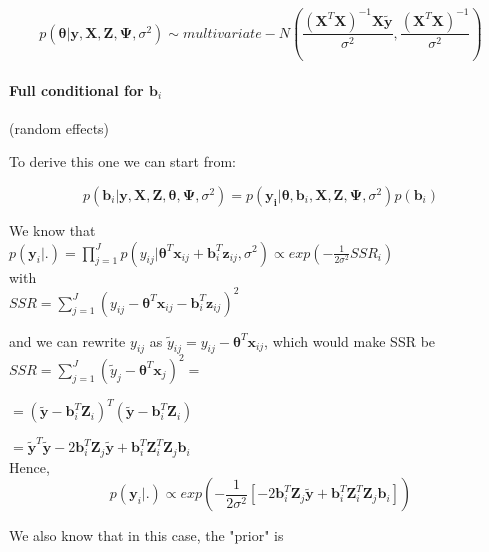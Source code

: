 \documentclass[a4paper]{article}
\begin{document}
\begin{equation}
	p(\bm{\theta}|\bm{y}, \bm{X}, \bm{Z}, \bm{\Psi}, \sigma^2) \sim multivariate-N(\frac{(\bm{X}^{T}\bm{X})^{-1}\bm{X}\bm{\tilde{y}}}{\sigma^2}, \frac{(\bm{X}^{T}\bm{X})^{-1}}{\sigma^2})
\end{equation}

\paragraph{Full conditional for $\bm{b}_{i}$} (random effects)

To derive this one we can start from:

\begin{equation}
	p(\bm{b}_{i}|\bm{y}, \bm{X}, \bm{Z}, \bm{\theta}, \bm{\Psi}, \sigma^2) = 	p(\bm{y_{i}}|\bm{\theta}, \bm{b}_{i}, \bm{X}, \bm{Z}, \bm{\Psi}, \sigma^2) p(\bm{b}_{i})
\end{equation}

We know that \\

$p(\bm{y}_{i}|.) = \prod_{j=1}^{J}p(y_{ij}|\bm{\theta}^{T}\bm{x}_{ij} + \bm{b}_{i}^{T}\bm{z}_{ij}, \sigma^2) \propto exp(-\frac{1}{2\sigma^2}SSR_{i})$\\

with\\

$SSR = \sum_{j = 1}^{J}( y_{ij}-\bm{\theta}^{T}\bm{x}_{ij} - \bm{b}_{i}^{T}\bm{z}_{ij})^2$

and we can rewrite $y_{ij}$ as $\tilde{y}_{ij} = y_{ij} - \bm{\theta}^{T}\bm{x}_{ij}$, which would make SSR be\\

$SSR = \sum_{j = 1}^{J}( \tilde{y}_{j}-\bm{\theta}^{T}\bm{x}_{j})^2=$

$= ( \tilde{\bm{y}} - \bm{b}_{i}^{T}\bm{Z}_{i})^{T}( \tilde{\bm{y}} - \bm{b}_{i}^{T}\bm{Z}_{i})$

$ = \tilde{\bm{y}}^{T}\tilde{\bm{y}} - 2\bm{b}_{i}^{T}\bm{Z}_{j}\tilde{\bm{y}} + \bm{b}_{i}^{T}\bm{Z}^{T}_{i} \bm{Z}_{j}\bm{b}_{i}$\\

Hence,
\begin{equation}
	p(\bm{y}_{i}|.) \propto exp(-\frac{1}{2\sigma^2}[- 2\bm{b}_{i}^{T}\bm{Z}_{j}\tilde{\bm{y}} + \bm{b}_{i}^{T}\bm{Z}^{T}_{i} \bm{Z}_{j}\bm{b}_{i}])
\end{equation}

We also know that in this case, the "prior" is
\end{document}
